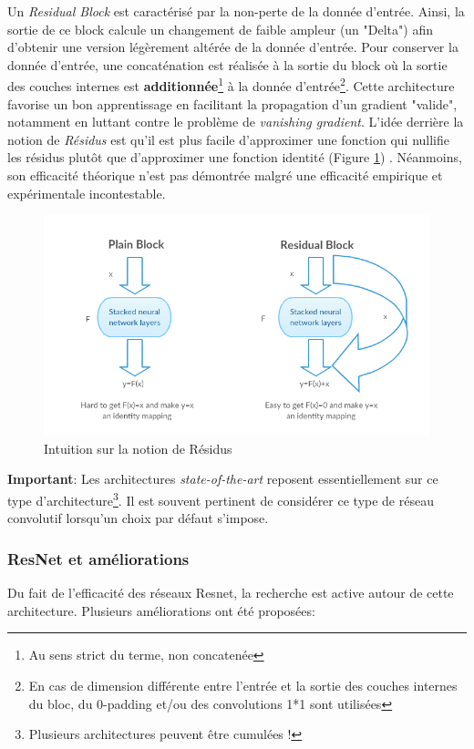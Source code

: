 \noindent Un \textit{Residual Block} est caractérisé par la non-perte de la donnée d'entrée. Ainsi, la sortie de ce block calcule un changement de faible ampleur (un "Delta") afin d'obtenir une version légèrement altérée de la donnée d'entrée. Pour conserver la donnée d'entrée, une concaténation est réalisée à la sortie du block où la sortie des couches internes est \textbf{additionnée}\footnote{Au sens strict du terme, non concatenée} à la donnée d'entrée\footnote{En cas de dimension différente entre l'entrée et la sortie des couches internes du bloc, du 0-padding et/ou des convolutions 1*1 sont utilisées}. Cette architecture favorise un bon apprentissage en facilitant la propagation d'un gradient "valide", notamment en luttant contre le problème de \textit{vanishing gradient}. L'idée derrière la notion de \textit{Résidus} est qu'il est plus facile d'approximer une fonction qui nullifie les résidus plutôt que d'approximer une fonction identité (Figure \ref{residual2}) . Néanmoins, son efficacité théorique n'est pas démontrée malgré une efficacité empirique et expérimentale incontestable.\\

\begin{figure}
    \centering
    \includegraphics[scale=0.3]{./tex/convolution-network/classifier/resnet2.png}
    \caption{Intuition sur la notion de Résidus}
    \label{residual2}
\end{figure}

\noindent \textbf{Important}: Les architectures \textit{state-of-the-art} reposent essentiellement sur ce type d'architecture\footnote{Plusieurs architectures peuvent être cumulées !}. Il est souvent pertinent de considérer ce type de réseau convolutif lorsqu'un choix par défaut s'impose.

\subsubsection{ResNet et améliorations}
Du fait de l'efficacité des réseaux Resnet, la recherche est active autour de cette architecture. Plusieurs améliorations ont été proposées: \\

